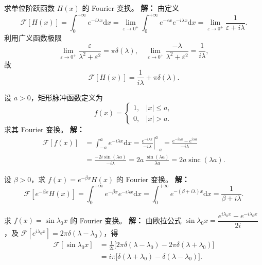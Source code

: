 
\begin{tcolorbox}[title=例 1：单位阶跃函数, colframe=orange!75!black, colback=orange!5!white, sharp corners]
  求单位阶跃函数 $H(x)$ 的 Fourier 变换。
  \tcbline
  \textbf{解：} 由定义
  \[
  \mathcal{F}[H(x)]=\int_{0}^{+\infty}e^{-i\lambda x}\mathrm{d}x
  =\lim_{\varepsilon\to 0^+}\int_{0}^{+\infty}e^{-\varepsilon x}e^{-i\lambda x}\mathrm{d}x
  =\lim_{\varepsilon\to 0^+}\frac{1}{\varepsilon+i\lambda}.
  \]
  利用广义函数极限
  \[
  \lim_{\varepsilon\to 0^+}\frac{\varepsilon}{\lambda^2+\varepsilon^2}=\pi\delta(\lambda),\quad
  \lim_{\varepsilon\to 0^+}\frac{-\lambda}{\lambda^2+\varepsilon^2}= \frac{1}{i\lambda},
  \]
  故
  \[
  \mathcal{F}[H(x)]=\frac{1}{i\lambda}+\pi\delta(\lambda).
  \]
\end{tcolorbox}

\begin{tcolorbox}[title=例 2：矩形脉冲（门函数）, colframe=orange!75!black, colback=orange!5!white, sharp corners]
  设 $a>0$，矩形脉冲函数定义为
  \[
  f(x)=\begin{cases}
    1, & |x|\le a,\\
    0, & |x|>a.
  \end{cases}
  \]
  求其 Fourier 变换。
  \tcbline
  \textbf{解：} 
  \[
  \begin{aligned}
    \mathcal{F}[f(x)]&=\int_{-a}^{a} e^{-i\lambda x}\mathrm{d}x
    =\left.\frac{e^{-i\lambda x}}{-i\lambda}\right|_{-a}^{a}
    =\frac{e^{-i\lambda a}-e^{i\lambda a}}{-i\lambda}\\[4pt]
    &=\frac{-2i\sin(\lambda a)}{-i\lambda}
    =2a\,\frac{\sin(\lambda a)}{\lambda a}
    =2a\operatorname{sinc}(\lambda a).
  \end{aligned}
  \]
\end{tcolorbox}

\begin{tcolorbox}[title=例 3：单边指数衰减函数, colframe=orange!75!black, colback=orange!5!white, sharp corners]
  设 $\beta>0$，求 $f(x)=e^{-\beta x}H(x)$ 的 Fourier 变换。
  \tcbline
  \textbf{解：}
  \[
  \mathcal{F}[e^{-\beta x}H(x)]=\int_{0}^{+\infty} e^{-\beta x}e^{-i\lambda x}\mathrm{d}x
  =\int_{0}^{+\infty} e^{-(\beta+i\lambda)x}\mathrm{d}x
  =\frac{1}{\beta+i\lambda}.
  \]
\end{tcolorbox}

\begin{tcolorbox}[title=例 4：正弦函数, colframe=orange!75!black, colback=orange!5!white, sharp corners]
  求 $f(x)=\sin\lambda_0 x$ 的 Fourier 变换。
  \tcbline
  \textbf{解：} 由欧拉公式 $\sin\lambda_0 x=\dfrac{e^{i\lambda_0 x}-e^{-i\lambda_0 x}}{2i}$，及 $\mathcal{F}[e^{i\lambda_0 x}]=2\pi\delta(\lambda-\lambda_0)$，得
  \[
  \begin{aligned}
    \mathcal{F}[\sin\lambda_0 x]
    &=\frac{1}{2i}\big[2\pi\delta(\lambda-\lambda_0)-2\pi\delta(\lambda+\lambda_0)\big]\\
    &=i\pi\big[\delta(\lambda+\lambda_0)-\delta(\lambda-\lambda_0)\big].
  \end{aligned}
  \]
\end{tcolorbox}

